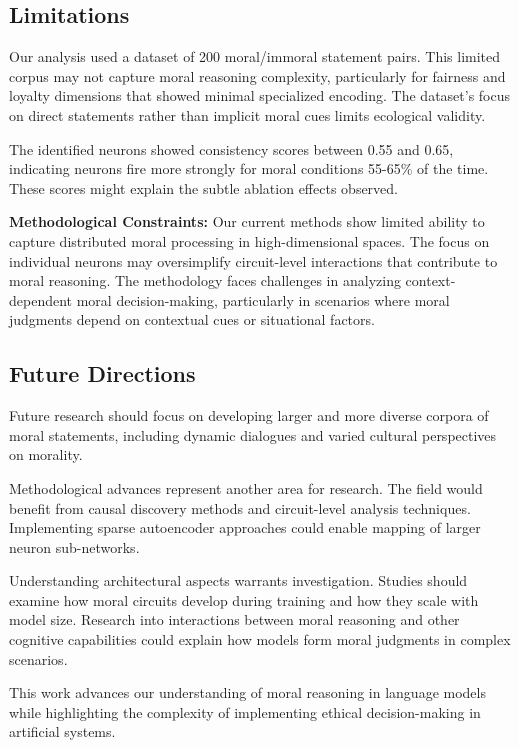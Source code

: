 \documentclass[runninghheads]{llncs}
\begin{document}
\subsection{Limitations}

Our analysis used a dataset of 200 moral/immoral statement pairs. This limited corpus may not capture moral reasoning complexity, particularly for fairness and loyalty dimensions that showed minimal specialized encoding. The dataset's focus on direct statements rather than implicit moral cues limits ecological validity.

The identified neurons showed consistency scores between 0.55 and 0.65, indicating neurons fire more strongly for moral conditions 55-65\% of the time. These scores might explain the subtle ablation effects observed.

\textbf{Methodological Constraints:} Our current methods show limited ability to capture distributed moral processing in high-dimensional spaces. The focus on individual neurons may oversimplify circuit-level interactions that contribute to moral reasoning. The methodology faces challenges in analyzing context-dependent moral decision-making, particularly in scenarios where moral judgments depend on contextual cues or situational factors.

\subsection{Future Directions}

Future research should focus on developing larger and more diverse corpora of moral statements, including dynamic dialogues and varied cultural perspectives on morality.

Methodological advances represent another area for research. The field would benefit from causal discovery methods and circuit-level analysis techniques. Implementing sparse autoencoder approaches could enable mapping of larger neuron sub-networks.

Understanding architectural aspects warrants investigation. Studies should examine how moral circuits develop during training and how they scale with model size. Research into interactions between moral reasoning and other cognitive capabilities could explain how models form moral judgments in complex scenarios.

This work advances our understanding of moral reasoning in language models while highlighting the complexity of implementing ethical decision-making in artificial systems.
\end{document}

